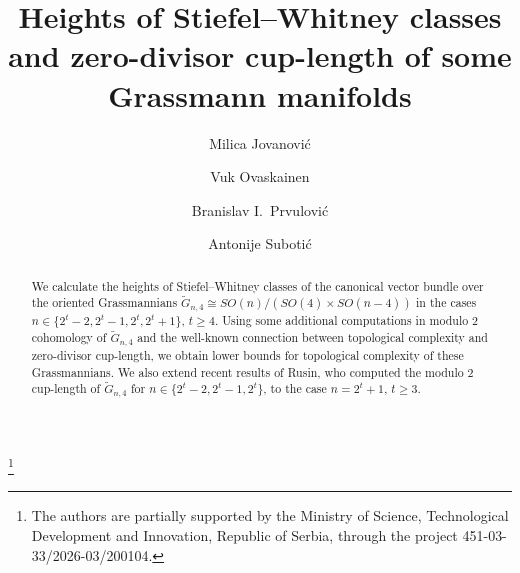\documentclass{amsart}
\theoremstyle{definition}
\theoremstyle{remark}
\numberwithin{equation}{section}
\newcommand{\gr}{\widetilde G}
\renewcommand{\ge}{\geqslant}
\begin{document}
\title[Heights of SW-classes and zcl of Grassmannians]{Heights of Stiefel--Whitney classes and zero-divisor cup-length of some Grassmann manifolds}


\author[M. Jovanovi\' c]{Milica Jovanovi\' c}
\address{University of Belgrade,
  Faculty of mathematics,
  Studentski trg 16,
  Belgrade,
  Serbia}


\author[V. Ovaskainen]{Vuk Ovaskainen}
\address{University of Belgrade,
  Faculty of mathematics,
  Studentski trg 16,
  Belgrade,
  Serbia}


\author[B. I. Prvulovi\' c]{Branislav I.\ Prvulovi\'c}
\address{University of Belgrade,
  Faculty of mathematics,
  Studentski trg 16,
  Belgrade,
  Serbia}




\author[A. Suboti\' c]{Antonije Suboti\' c}
\address{University of Belgrade,
  Faculty of mathematics,
  Studentski trg 16,
  Belgrade,
  Serbia}

\thanks{The authors are partially supported by the Ministry of Science, Technological Development and Innovation, Republic of Serbia, through the project 451-03-33/2026-03/200104.} 





\begin{abstract}
We calculate the heights of Stiefel--Whitney classes of the canonical vector bundle over the oriented Grassmannians $\gr_{n,4}\cong SO(n)/(SO(4)\times SO(n-4))$ in the cases $n\in\{2^t-2,2^t-1,2^t,2^t+1\}$, $t\ge4$. Using some additional computations in modulo $2$ cohomology of $\gr_{n,4}$ and the well-known connection between topological complexity and zero-divisor cup-length, we obtain lower bounds for topological complexity of these Grassmannians. We also extend recent results of Rusin, who computed the modulo $2$ cup-length of $\gr_{n,4}$ for $n\in\{2^t-2,2^t-1,2^t\}$, to the case $n=2^t+1$, $t\ge3$.
\end{abstract}

\maketitle
\end{document}

